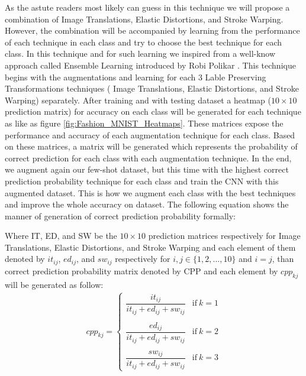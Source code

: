 As the astute readers most likely can guess in this technique we will propose a combination of Image
Translations, Elastic Distortions, and Stroke Warping. However, the combination will be accompanied
by learning from the performance of each technique in each class and try to choose the best
technique for each class. In this technique and for such learning we inspired from a well-know
approach called Ensemble Learning introduced by Robi Polikar \cite{TODO}. This technique begins with the
augmentations and learning for each $3$ Lable Preserving Transformations techniques ( Image
Translations, Elastic Distortions, and Stroke Warping) separately. After training and with testing
dataset a heatmap ($10 \times 10$ prediction matrix) for accuracy on each class will be generated
for each technique as like as figure \ref{fig:Fashion_MNIST_Heatmaps}. These matrices expose the
performance and accuracy of each augmentation technique for each class. Based on these matrices, a
matrix will be generated which represents the probability of correct prediction for each class with
each augmentation technique. In the end, we augment again our few-shot dataset, but this time with
the highest correct prediction probability technique for each class and train the CNN with this
augmented dataset. This is how we augment each class with the best techniques and improve the whole
accuracy on dataset. The following equation shows the manner of generation of correct prediction probability formally:

Where IT, ED, and SW be the $10 \times 10$ prediction matrices respectively for Image Translations,
Elastic Distortions, and Stroke Warping and each element of them denoted by $it_{ij}$, $ed_{ij}$,
and $sw_{ij}$ respectively for $i,j \in \{1,2,...,10\}$ and $i=j$, than correct prediction probability
matrix denoted by CPP and each element by $cpp_{kj}$ will be generated as follow:
\begin{equation}
  \begin{aligned}
    cpp_{kj} =
    \begin{cases}
      \dfrac{it_{ij}}{it_{ij} + ed_{ij} + sw_{ij}} & \text{if}\ k=1 \\ \\
      \dfrac{ed_{ij}}{it_{ij} + ed_{ij} + sw_{ij}} & \text{if}\ k=2 \\ \\
      \dfrac{sw_{ij}}{it_{ij} + ed_{ij} + sw_{ij}} & \text{if}\ k=3
    \end{cases}
  \end{aligned}
\end{equation}

